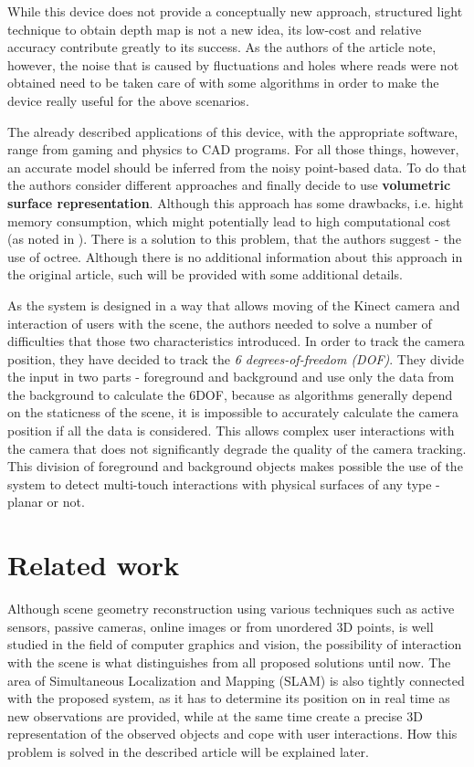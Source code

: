 \documentclass[11pt, a4paper]{article}
\theoremstyle{plain}
\begin{document}
  While this device does not provide a conceptually new approach, structured
  light technique to obtain depth map is not a new idea, its low-cost and
  relative accuracy contribute greatly to its success. As the authors of the
  article note, however, the noise that is caused by fluctuations and holes
  where reads were not obtained need to be taken care of with some algorithms in
  order to make the device really useful for the above scenarios. 

  The already described applications of this device, with the appropriate
  software, range from gaming and physics to CAD programs. For all those things,
  however, an accurate model should be inferred from the noisy point-based data.
  To do that the authors consider different approaches and finally decide to use 
  \textbf{volumetric surface representation}. Although this approach has some 
  drawbacks, i.e. hight memory consumption, which might potentially lead to high
  computational cost (as noted in
  \cite{representaion-and-rendering-of-implicit-surfaces}). There is a
  solution to this problem, that the authors suggest - the use of octree.
  Although there is no additional information about this approach in the
  original article, such will be provided with some additional details. 

  As the system is designed in a way that allows moving of the Kinect camera and
  interaction of users with the scene, the authors needed to solve a number of
  difficulties that those two characteristics introduced. In order to track the
  camera position, they have decided to track the \emph{6 degrees-of-freedom
  (DOF)}. They divide the input in two parts - foreground and background and use
  only the data from the background to calculate the 6DOF, because as algorithms
  generally depend on the staticness of the scene, it is impossible to
  accurately calculate the camera position if all the data is considered. This
  allows complex user interactions with the camera that does not significantly
  degrade the quality of the camera tracking. This division of foreground and
  background objects makes possible the use of the system to detect multi-touch
  interactions with physical surfaces of any type - planar or not.


\section{Related work} %
\label{sec:Related work}
  Although scene geometry reconstruction using various techniques such as active
  sensors, passive cameras, online images or from unordered 3D points, is well
  studied in the field of computer graphics and vision, the possibility of
  interaction with the scene is what distinguishes \cite{kinectfusion} from all
  proposed solutions until now. The area of Simultaneous Localization and
  Mapping (SLAM) is also tightly connected with the proposed system, as it has
  to determine its position on in real time as new observations are provided,
  while at the same time create a precise 3D representation of the observed
  objects and cope with user interactions. How this problem is solved in the
  described article will be explained later.
\end{document}
